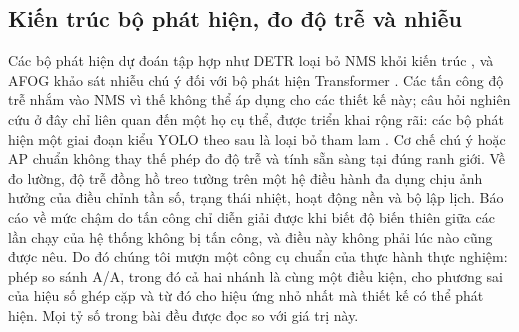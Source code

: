 \documentclass[a4paper,fleqn]{cas-dc}
\begin{document}
\subsection{Kiến trúc bộ phát hiện, đo độ trễ và nhiễu}
Các bộ phát hiện dự đoán tập hợp như DETR loại bỏ NMS khỏi kiến trúc \cite{carion2020detr}, và AFOG khảo sát nhiễu chú ý đối với bộ phát hiện Transformer \cite{afog2025}. Các tấn công độ trễ nhắm vào NMS vì thế không thể áp dụng cho các thiết kế này; câu hỏi nghiên cứu ở đây chỉ liên quan đến một họ cụ thể, được triển khai rộng rãi: các bộ phát hiện một giai đoạn kiểu YOLO theo sau là loại bỏ tham lam \cite{redmon2016yolo,neubeck2006nms,yolov12,yolov13}. Cơ chế chú ý hoặc AP chuẩn không thay thế phép đo độ trễ và tính sẵn sàng tại đúng ranh giới. Về đo lường, độ trễ đồng hồ treo tường trên một hệ điều hành đa dụng chịu ảnh hưởng của điều chỉnh tần số, trạng thái nhiệt, hoạt động nền và bộ lập lịch. Báo cáo về mức chậm do tấn công chỉ diễn giải được khi biết độ biến thiên giữa các lần chạy của hệ thống không bị tấn công, và điều này không phải lúc nào cũng được nêu. Do đó chúng tôi mượn một công cụ chuẩn của thực hành thực nghiệm: phép so sánh A/A, trong đó cả hai nhánh là cùng một điều kiện, cho phương sai của hiệu số ghép cặp và từ đó cho hiệu ứng nhỏ nhất mà thiết kế có thể phát hiện. Mọi tỷ số trong bài đều được đọc so với giá trị này.
\end{document}
